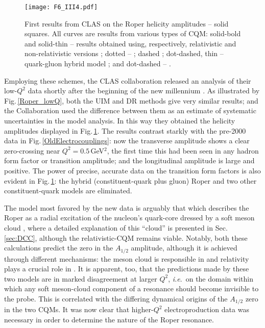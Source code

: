 \begin{figure}[t]
\centerline{\texttt{[image: F6\_III4.pdf]}}
\caption{\label{A12_lowQ}
First results from CLAS on the Roper helicity amplitudes \cite{Aznauryan:2004jd} -- solid squares.
%
All curves are results from various types of CQM:
%
solid-bold and solid-thin -- results obtained using, respectively, relativistic and non-relativistic versions \cite{Capstick:1994ne};
%
dotted -- \cite{Warns:1989ie};
dashed \cite{Cano:1998wz};
dot-dashed, thin -- quark-gluon hybrid model \cite{Li:1991yba};
and dot-dashed --  \cite{Tiator:2003uu}.}
\end{figure}

Employing these schemes, the CLAS collaboration released an analysis of their low-$Q^2$ data shortly after the beginning of the new millennium \cite{Aznauryan:2004jd}.   As illustrated by Fig.\,\ref{Roper_lowQ}, both the UIM and DR methods give very similar results; and the Collaboration used the difference between them as an estimate of systematic uncertainties in the model analysis.  In this way they obtained the helicity amplitudes displayed in Fig.\,\ref{A12_lowQ}.  The results contrast starkly with the pre-2000 data in Fig.\,\ref{OldElectrocouplings}: now the transverse amplitude shows a clear zero-crossing near $Q^2=0.5\,$GeV$^2$, the first time this had been seen in any hadron form factor or transition amplitude; and the longitudinal amplitude is large and positive.  The power of precise, accurate data on the transition form factors is also evident in Fig.\,\ref{A12_lowQ}: the hybrid (constituent-quark plus gluon) Roper \cite{Li:1991yba} and two other constituent-quark models \cite{Warns:1989ie, Tiator:2003uu} are eliminated.

The model most favored by the new data is arguably that which describes the Roper as a radial excitation of the nucleon's quark-core dressed by a soft meson cloud \cite{Cano:1998wz}, where a detailed explanation of this ``cloud'' is presented in Sec.\,\ref{sec:DCC}, although the relativistic-CQM \cite{Capstick:1994ne} remains viable.
%
Notably, both these calculations predict the zero in the $A_{1/2}$ amplitude, although it is achieved through different mechanisms: the meson cloud is responsible in \cite{Cano:1998wz} and relativity plays a crucial role in \cite{Capstick:1994ne}.
%
It is apparent, too, that the predictions made by these two models are in marked disagreement at larger $Q^2$, \emph{i.e}.\ on the domain within which any soft meson-cloud component of a resonance should become invisible to the probe.  This is correlated with the differing dynamical origins of the $A_{1/2}$ zero in the two CQMs.
%
It was now clear that higher-$Q^2$ electroproduction data was necessary in order to determine the nature of the Roper resonance.

